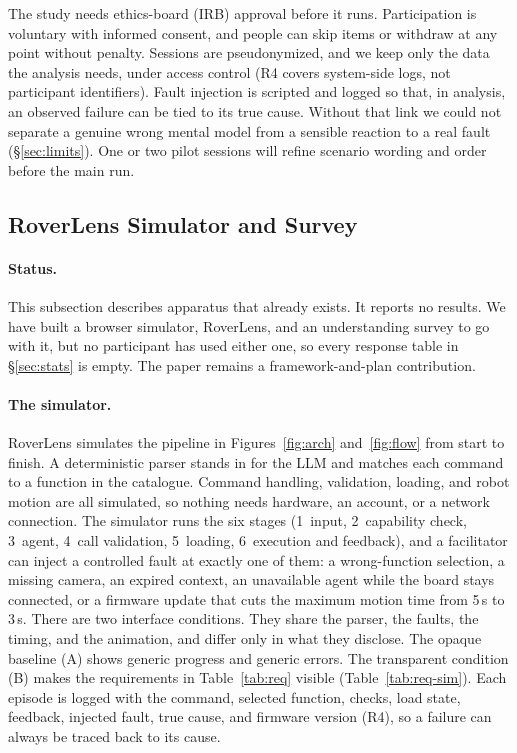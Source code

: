 \documentclass[sigconf]{acmart}
\begin{document}
The study needs ethics-board (IRB) approval before it runs. Participation is voluntary with informed consent, and people can skip items or withdraw at any point without penalty. Sessions are pseudonymized, and we keep only the data the analysis needs, under access control (R4 covers system-side logs, not participant identifiers). Fault injection is scripted and logged so that, in analysis, an observed failure can be tied to its true cause. Without that link we could not separate a genuine wrong mental model from a sensible reaction to a real fault (\S\ref{sec:limits}). One or two pilot sessions will refine scenario wording and order before the main run.

\subsection{RoverLens Simulator and Survey}\label{sec:survey}

\paragraph{Status.}
This subsection describes apparatus that already exists. It reports no results. We have built a browser simulator, RoverLens, and an understanding survey to go with it, but no participant has used either one, so every response table in \S\ref{sec:stats} is empty. The paper remains a framework-and-plan contribution.

\paragraph{The simulator.}
RoverLens simulates the pipeline in Figures~\ref{fig:arch} and~\ref{fig:flow} from start to finish. A deterministic parser stands in for the LLM and matches each command to a function in the catalogue. Command handling, validation, loading, and robot motion are all simulated, so nothing needs hardware, an account, or a network connection. The simulator runs the six stages (1~input, 2~capability check, 3~agent, 4~call validation, 5~loading, 6~execution and feedback), and a facilitator can inject a controlled fault at exactly one of them: a wrong-function selection, a missing camera, an expired context, an unavailable agent while the board stays connected, or a firmware update that cuts the maximum motion time from 5\,s to 3\,s. There are two interface conditions. They share the parser, the faults, the timing, and the animation, and differ only in what they disclose. The opaque baseline (A) shows generic progress and generic errors. The transparent condition (B) makes the requirements in Table~\ref{tab:req} visible (Table~\ref{tab:req-sim}). Each episode is logged with the command, selected function, checks, load state, feedback, injected fault, true cause, and firmware version (R4), so a failure can always be traced back to its cause.
\end{document}
